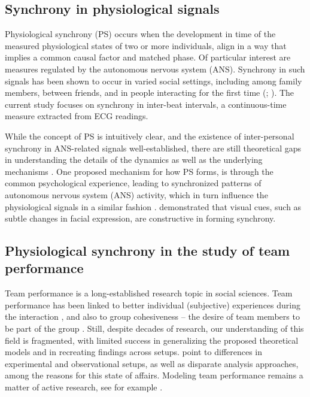 \documentclass[a4paper, 11pt]{report}      %
\begin{document}
\subsection{Synchrony in physiological signals}
Physiological synchrony (PS) occurs when the development in time of the measured physiological states of two or more individuals, align in a way that implies a common causal factor and matched phase. Of particular interest are measures regulated by the autonomous nervous system (ANS). Synchrony in such signals has been shown to occur in varied social settings, including among family members, between friends, and in people interacting for the first time (\cite{palumbo2017interpersonal}; \cite{jar202physiological}). The current study focuses on synchrony in  inter-beat intervals, a continuous-time measure extracted from ECG readings. 

While the concept of PS is intuitively clear, and the existence of inter-personal synchrony in ANS-related signals well-established, there are still theoretical gaps in understanding the details of the dynamics as well as the underlying mechanisms \citep{jar202physiological}. 
One proposed mechanism for how PS forms, is through the common psychological experience, leading to synchronized patterns of autonomous nervous system (ANS) activity, which in turn influence the physiological signals in a similar fashion \citep{palumbo2017interpersonal}. \citet{behrens2020physiological} 
demonstrated that visual cues, such as subtle changes in facial expression, are constructive in forming synchrony. 

\subsection{Physiological synchrony in the study of team performance}
Team performance is a long-established research topic in social sciences. Team performance has been linked to better individual (subjective) experiences during the interaction \citep{lodahl1961psychometric}, and also to group cohesiveness -- the desire of team members to be part of the group \citep{cartwright1968nature}. Still, despite decades of research, our understanding of this field is fragmented, with limited success in generalizing the proposed theoretical models and in recreating findings across setups. \citet{beal2003cohesion} point to differences in experimental and observational setups, as well as disparate analysis approaches, among the reasons for this state of affairs. Modeling team performance remains a matter of active research, see for example \citet{collins2019explorations}.
\end{document}
